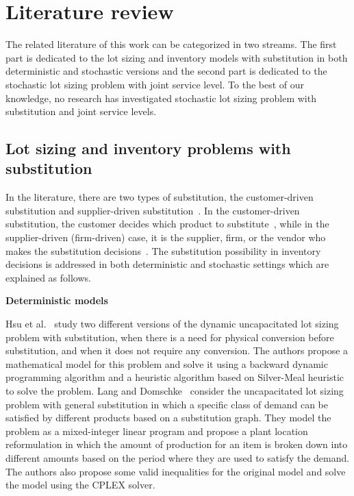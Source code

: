 \documentclass[11pt]{article}
\begin{document}
\section{Literature review}
\label{sec:litrev}
The related literature of this work can be categorized in two streams. The first part is dedicated to the lot sizing and inventory models with substitution in both deterministic and stochastic versions and the second part is dedicated to the stochastic lot sizing problem with joint service level. To the best of our knowledge, no research has investigated stochastic lot sizing problem with substitution and joint service levels.

\subsection{Lot sizing and inventory problems with substitution}
In the literature, there are two types of substitution, the customer-driven substitution and supplier-driven substitution~\cite{shin2015classification}. In the customer-driven substitution, the customer decides which product to substitute~\cite{zeppetella2017optimal}, while in the supplier-driven (firm-driven) case, it is the supplier, firm, or the vendor who makes the substitution decisions~\cite{rao2004multi}. The substitution possibility in inventory decisions is addressed in both deterministic and stochastic settings which are explained as follows.

\textbf{Deterministic models}

Hsu et al.~\cite{hsu2005dynamic} study two different versions of the dynamic uncapacitated lot sizing problem with substitution, when there is a need for physical conversion before substitution, and when it does not require any conversion. The authors propose a mathematical model for this problem and solve it using a backward dynamic programming algorithm and a heuristic algorithm based on Silver-Meal heuristic to solve the problem.  Lang and Domschke~\cite{lang2010efficient} consider the uncapacitated lot sizing problem with general substitution in which a specific class of demand can be satisfied by different products based on a substitution graph. They model the problem as a mixed-integer linear program and propose a plant location reformulation in which the amount of production for an item is broken down into different amounts based on the period where they are used to satisfy the demand. The authors also propose some valid inequalities for the original model and solve the model using the CPLEX solver.
\end{document}
